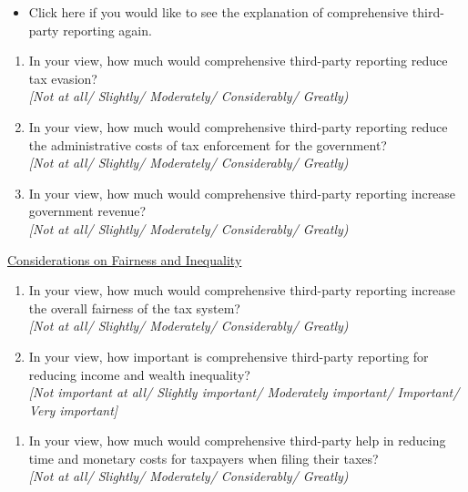 \documentclass[11pt]{article}
\begin{document}
\begin{itemize}
    \item[$\rightarrow$] Click here if you would like to see the explanation of comprehensive third-party reporting again.
\end{itemize}
\begin{enumerate}[resume]
    \item In your view, how much would comprehensive third-party reporting reduce tax evasion? \\
    \textit{[Not at all/ Slightly/ Moderately/ Considerably/ Greatly)} 
    \item In your view, how much would comprehensive third-party reporting reduce the administrative costs of tax enforcement for the government? \\
    \textit{[Not at all/ Slightly/ Moderately/ Considerably/ Greatly)} 
    \item In your view, how much would comprehensive third-party reporting increase government revenue?  \\
    \textit{[Not at all/ Slightly/ Moderately/ Considerably/ Greatly)} 
\end{enumerate}
\underline{Considerations on Fairness and Inequality}
\begin{enumerate}[resume]
    \item In your view, how much would comprehensive third-party reporting increase the overall fairness of the tax system? \\
    \textit{[Not at all/ Slightly/ Moderately/ Considerably/ Greatly)} 
    \item In your view, how important is comprehensive third-party reporting for reducing income and wealth inequality? \\
    \textit{[Not important at all/ Slightly important/ Moderately important/ Important/ Very important]}
\end{enumerate}
\begin{enumerate}[resume]    
    \item In your view, how much would comprehensive third-party help in reducing time and monetary costs for taxpayers when filing their taxes? \\
    \textit{[Not at all/ Slightly/ Moderately/ Considerably/ Greatly)} 
\end{enumerate}
\end{document}
